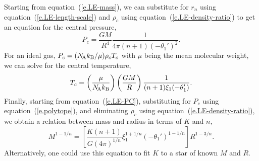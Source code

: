 Starting from equation~(\ref{e.LE-mass}), we can substitute for $r_{n}$ using equation~(\ref{e.LE-length-scale}) and $\rho_{c}$ using equation~(\ref{e.LE-density-ratio}) to get an equation for the central pressure,
\begin{equation}\label{e.LE-PC}
P_{c} = \frac{GM}{R^{4}} \frac{1}{4\pi(n+1)(-\theta_{1}')^{2}}.
\end{equation}
For an ideal gas, $P_{c} = (N_\mathrm{\!A}k_\mathrm{B}/\mu)\rho_{c}T_{c}$ with $\mu$ being the mean molecular weight, we can solve for the central temperature,
\begin{equation}\label{e.LE-TC}
T_{c} = \left(\frac{\mu}{N_\mathrm{\!A}k_\mathrm{B}}\right)\left(\frac{GM}{R}\right)\frac{1}{(n+1)\xi_{1}(-\theta_{1}')}.
\end{equation}
Finally, starting from equation~(\ref{e.LE-PC}), substituting for $P_{c}$ using equation~(\ref{e.polytope}), and eliminating $\rho_{c}$ using equation~(\ref{e.LE-density-ratio}), we obtain a relation between mass and radius in terms of $K$ and $n$,
\begin{equation}\label{e.LE-mass-radius}
M^{1-1/n} = \left[\frac{K(n+1)}{G(4\pi)^{1/n}} \xi_{1}^{1+1/n}\left(-\theta_{1}'\right)^{1-1/n} \right] R^{1-3/n}.
\end{equation}
Alternatively, one could use this equation to fit $K$ to a star of known $M$ and $R$.

